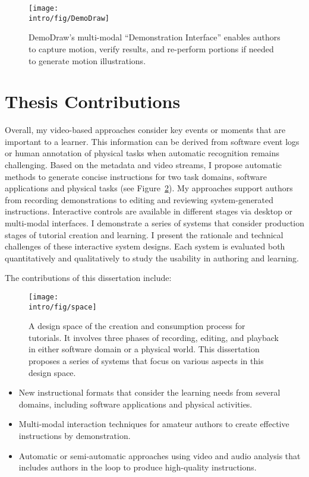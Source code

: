 \begin{figure}[t]
  \centering
  \texttt{[image: \\intro/fig/DemoDraw]}
  \caption{DemoDraw's multi-modal ``Demonstration Interface'' enables authors  to capture motion, verify results, and re-perform portions if needed to generate motion illustrations.}
  \label{fig:demodraw_intro}
\end{figure}


\section{Thesis Contributions}

Overall, my video-based approaches consider key events or moments that are important to a learner. This information can be derived from software event logs or human annotation of physical tasks when automatic recognition remains challenging. Based on the metadata and video streams, I propose automatic methods to generate concise instructions for two task domains, software applications and physical tasks (see Figure~\ref{fig:space}). My approaches support authors from recording demonstrations to editing and reviewing system-generated instructions. Interactive controls are available in different stages via desktop or multi-modal interfaces.
%
I demonstrate a series of systems that consider production stages of tutorial creation and learning. I present the rationale and technical challenges of these interactive system designs. Each system is evaluated both quantitatively and qualitatively to study the usability in authoring and learning.

The contributions of this dissertation include:

\begin{figure}[t]
  \centering
  \texttt{[image: \\intro/fig/space]}
  \caption{A design space of the creation and consumption process for tutorials. It involves three phases of recording, editing, and playback in either software domain or a physical world. This dissertation proposes a series of systems that focus on various aspects in this design space.}
  \label{fig:space}
\end{figure}

\begin{itemize}
\item New instructional formats that consider the learning needs from several domains, including software applications and physical activities.
\item Multi-modal interaction techniques for amateur authors to create effective instructions by demonstration.
\item Automatic or semi-automatic approaches using video and audio analysis that includes authors in the loop to produce high-quality instructions.
\end{itemize}

